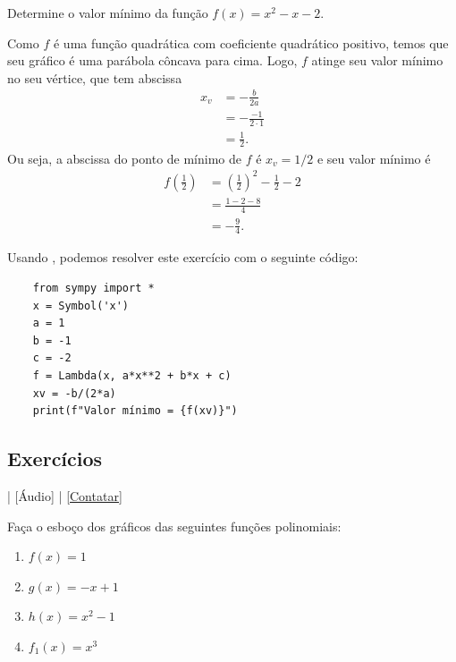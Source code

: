 \begin{exeresol}
  Determine o valor mínimo da função $f(x) = x^2 - x - 2$.
\end{exeresol}
\begin{resol}
  Como $f$ é uma função quadrática com coeficiente quadrático positivo, temos que seu gráfico é uma parábola côncava para cima. Logo, $f$ atinge seu valor mínimo no seu vértice, que tem abscissa
  \begin{align}
    x_v &= -\frac{b}{2a}\\
        &= -\frac{-1}{2\cdot 1}\\
        &= \frac{1}{2}.
  \end{align}
  Ou seja, a abscissa do ponto de mínimo de $f$ é $x_v=1/2$ e seu valor mínimo é
  \begin{align}
    f\left(\frac{1}{2}\right) &= \left(\frac{1}{2}\right)^2-\frac{1}{2}-2\\
                              &= \frac{1-2-8}{4}\\
                              &= -\frac{9}{4}.
  \end{align}

  \ifispython
  Usando {\sympy}, podemos resolver este exercício com o seguinte código:
  \begin{lstlisting}
    from sympy import *
    x = Symbol('x')
    a = 1
    b = -1
    c = -2
    f = Lambda(x, a*x**2 + b*x + c)
    xv = -b/(2*a)
    print(f"Valor mínimo = {f(xv)}")
  \end{lstlisting}
  \fi
\end{resol}

\subsection*{Exercícios}

\begin{flushright}
  [Vídeo] | [Áudio] | \href{https://phkonzen.github.io/notas/contato.html}{[Contatar]}
\end{flushright}

\begin{exer}
  Faça o esboço dos gráficos das seguintes funções polinomiais:
  \begin{enumerate}
  \item $f(x) = 1$
  \item $g(x) = -x + 1$
  \item $h(x) = x^2 - 1$
  \item $f_1(x) = x^3$
  \end{enumerate}
\end{exer}

